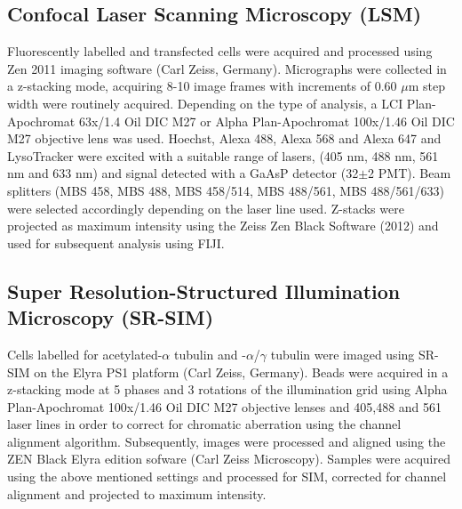 \subsection{Confocal Laser Scanning Microscopy (LSM)}
Fluorescently labelled and transfected cells were acquired and processed using Zen 2011 imaging software (Carl Zeiss, Germany). Micrographs were collected in a z-stacking mode, acquiring 8-10 image frames with increments of 0.60 $\mu$m step width were routinely acquired. Depending on the type of analysis, a LCI Plan-Apochromat 63x/1.4 Oil DIC M27 or Alpha Plan-Apochromat 100x/1.46 Oil DIC M27 objective lens was used. Hoechst, Alexa 488, Alexa 568 and Alexa 647 and LysoTracker were excited with a suitable range of lasers, (405 nm, 488 nm, 561 nm and 633 nm) and signal detected with a GaAsP detector (32$\pm$2 PMT). Beam splitters (MBS 458, MBS 488, MBS 458/514, MBS 488/561, MBS 488/561/633) were selected accordingly depending on the laser line used. Z-stacks were projected as maximum intensity using the Zeiss Zen Black Software (2012) and used for subsequent analysis using FIJI.

\subsection{Super Resolution-Structured Illumination Microscopy (SR-SIM)}
Cells labelled for acetylated-$\alpha$ tubulin and -$\alpha$/$\gamma$ tubulin were imaged using SR-SIM on the Elyra PS1 platform (Carl Zeiss, Germany). Beads were acquired in a z-stacking mode at 5 phases and 3 rotations  of the illumination grid using Alpha Plan-Apochromat 100x/1.46 Oil DIC M27 objective lenses and 405,488 and 561 laser lines in order to correct for chromatic aberration using the channel alignment algorithm. Subsequently, images were processed and aligned using the ZEN Black Elyra edition sofware (Carl Zeiss Microscopy). Samples were acquired using the above mentioned settings and processed for SIM, corrected for channel alignment and projected to maximum intensity. 

